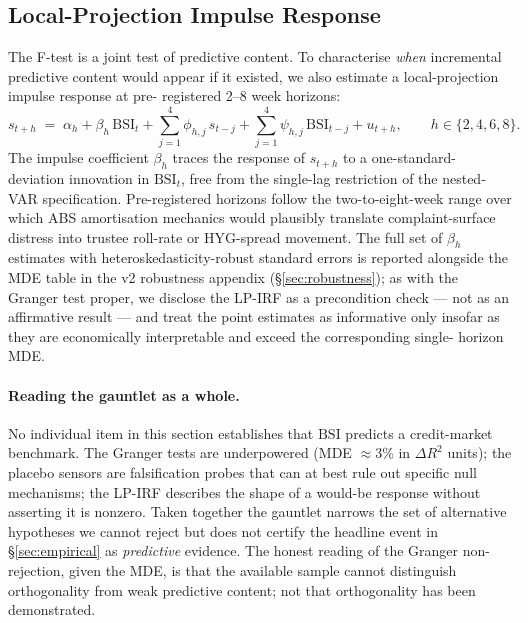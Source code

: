 \documentclass[11pt,letterpaper]{article}
\newcommand{\bsi}{\text{BSI}}
\begin{document}
\subsection{Local-Projection Impulse Response}
\label{sec:lpirf}

The \citet{granger1969investigating} F-test is a joint test of
predictive content. To characterise \emph{when} incremental predictive
content would appear if it existed, we also estimate a
\citet{jorda2005estimation} local-projection impulse response at pre-
registered 2--8 week horizons:
%
\begin{equation}
s_{t+h} \;=\; \alpha_h + \beta_h\, \bsi_t + \sum_{j=1}^{4} \phi_{h,j}\, s_{t-j}
          + \sum_{j=1}^{4} \psi_{h,j}\, \bsi_{t-j} + u_{t+h},
\qquad h \in \{2, 4, 6, 8\}.
\label{eq:lpirf}
\end{equation}
%
The impulse coefficient $\beta_h$ traces the response of $s_{t+h}$ to
a one-standard-deviation innovation in $\bsi_t$, free from the
single-lag restriction of the nested-VAR specification. Pre-registered
horizons follow the two-to-eight-week range over which ABS amortisation
mechanics would plausibly translate complaint-surface distress into
trustee roll-rate or HYG-spread movement. The full set of $\beta_h$
estimates with heteroskedasticity-robust standard errors is reported
alongside the MDE table in the v2 robustness appendix
(\S\ref{sec:robustness}); as with the Granger test proper, we disclose
the LP-IRF as a precondition check --- not as an affirmative result
--- and treat the point estimates as informative only insofar as they
are economically interpretable and exceed the corresponding single-
horizon MDE.

\paragraph{Reading the gauntlet as a whole.}
No individual item in this section establishes that $\bsi$ predicts a
credit-market benchmark. The Granger tests are underpowered (MDE
$\approx 3\%$ in $\Delta R^2$ units); the placebo sensors are
falsification probes that can at best rule out specific null
mechanisms; the LP-IRF describes the shape of a would-be response
without asserting it is nonzero. Taken together the gauntlet narrows
the set of alternative hypotheses we cannot reject but does not
certify the headline event in \S\ref{sec:empirical} as
\emph{predictive} evidence. The honest reading of the Granger
non-rejection, given the MDE, is that the available sample cannot
distinguish orthogonality from weak predictive content; not that
orthogonality has been demonstrated.
\end{document}
